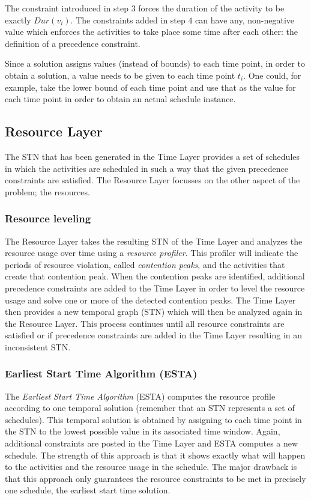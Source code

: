 \documentclass{article}
\newcommand{\dur}[1]{\textit{Dur}(#1)} %
\begin{document}
The constraint introduced in step $3$ forces the duration of the activity to be exactly $\dur{v_i}$. The constraints added in step $4$ can have any, non-negative value which enforces the activities to take place some time after each other: the definition of a precedence constraint.

Since a solution assigns values (instead of bounds) to each time point, in order to obtain a solution, a value needs to be given to each time point $t_i$.
One could, for example, take the lower bound of each time point and use that as the value for each time point in order to obtain an actual schedule instance.

\subsection{Resource Layer}
The STN that has been generated in the Time Layer provides a set of schedules in which the activities are scheduled in such a way that the given precedence constraints are satisfied. The Resource Layer focusses on the other aspect of the problem; the resources. 

\subsubsection{Resource leveling}
The Resource Layer takes the resulting STN of the Time Layer and analyzes the resource usage over time using a \emph{resource profiler}. This profiler will indicate the periods of resource violation, called \emph{contention peaks}, and the activities that create that contention peak. When the contention peaks are identified, additional precedence constraints are added to the Time Layer in order to level the resource usage and solve one or more of the detected contention peaks. The Time Layer then provides a new temporal graph (STN) which will then be analyzed again in the Resource Layer. This process continues until all resource constraints are satisfied or if precedence constraints are added in the Time Layer resulting in an inconsistent STN. 

\subsubsection{Earliest Start Time Algorithm (ESTA)}
The \emph{Earliest Start Time Algorithm} (ESTA) computes the resource profile according to one temporal solution (remember that an STN represents a set of schedules). This temporal solution is obtained by assigning to each time point in the STN to the lowest possible value in its associated time window. Again, additional constraints are posted in the Time Layer and ESTA computes a new schedule. The strength of this approach is that it shows exactly what will happen to the activities and the resource usage in the schedule. The major drawback is that this approach only guarantees the resource constraints to be met in precisely one schedule, the earliest start time solution. 
\end{document}
